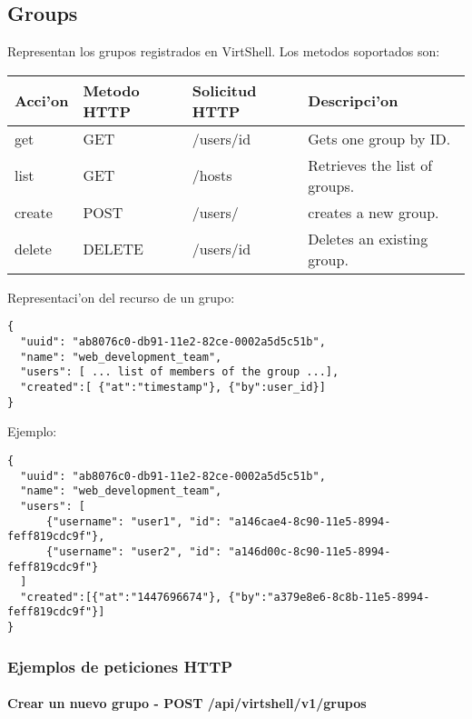 \subsection{Groups}
Representan los grupos registrados en VirtShell. Los metodos soportados son:

\begin{center}
 \begin{tabular}{| l | l | l | l |}
 \hline
  \rowcolor{blueapi}
  \textbf{Acci'on} & \textbf{Metodo HTTP} & \textbf{Solicitud HTTP} & \textbf{Descripci'on} \\ [0.5ex] 
  \hline\hline
  get & GET & /users/id & Gets one group by ID. \\
  \hline
  list & GET & /hosts & Retrieves the list of groups. \\  
  \hline
  create & POST & /users/ & creates a new group. \\
  \hline
  delete & DELETE & /users/id & Deletes an existing group. \\
  \hline
\end{tabular}
\end{center}

\vspace{1cm}
Representaci'on del recurso de un grupo:
\vspace{1cm}

\begin{lstlisting}[style=json]
{
  "uuid": "ab8076c0-db91-11e2-82ce-0002a5d5c51b",
  "name": "web_development_team",
  "users": [ ... list of members of the group ...],  
  "created":[ {"at":"timestamp"}, {"by":user_id}]
}
\end{lstlisting}

Ejemplo:

\medskip
\begin{lstlisting}[style=json]
{
  "uuid": "ab8076c0-db91-11e2-82ce-0002a5d5c51b",
  "name": "web_development_team",
  "users": [ 
      {"username": "user1", "id": "a146cae4-8c90-11e5-8994-feff819cdc9f"},
      {"username": "user2", "id": "a146d00c-8c90-11e5-8994-feff819cdc9f"}
  ]
  "created":[{"at":"1447696674"}, {"by":"a379e8e6-8c8b-11e5-8994-feff819cdc9f"}]
}
\end{lstlisting}

\subsubsection{Ejemplos de peticiones HTTP}

\paragraph{Crear un nuevo grupo - POST /api/virtshell/v1/grupos} ~\\

